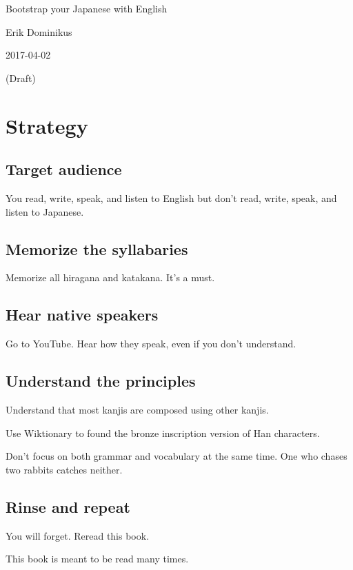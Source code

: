 \documentclass[12pt,a4paper,openany]{book}
\begin{document}
\frontmatter
{%
    \setlength\parindent{0em}%
    Bootstrap your Japanese with English\par
    Erik Dominikus\par
    2017-04-02\par
    (Draft)\par
}
\newpage
{}
{}
\tableofcontents
\mainmatter
\chapter{Strategy}

\section{Target audience}

You read, write, speak, and listen to English but don't read, write, speak, and listen to Japanese.

\section{Memorize the syllabaries}

Memorize all hiragana and katakana.
It's a must.

\section{Hear native speakers}

Go to YouTube.
Hear how they speak, even if you don't understand.

\section{Understand the principles}

Understand that most kanjis are composed using other kanjis.

Use Wiktionary to found the bronze inscription version of Han characters.

Don't focus on both grammar and vocabulary at the same time.
One who chases two rabbits catches neither.

\section{Rinse and repeat}

You will forget.
Reread this book.

This book is meant to be read many times.
\end{document}
